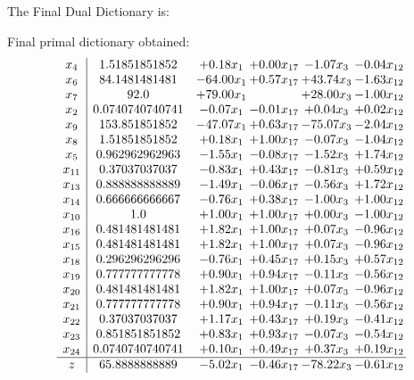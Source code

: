 \documentclass[8pt]{article}
\begin{document}
The Final Dual Dictionary is: 

 Final primal dictionary obtained: 
\[\begin{array}{c| c c@{\hskip 2pt} c@{\hskip 2pt} c@{\hskip 2pt} c@{\hskip 2pt} }
 x_{4}   &  1.51851851852 & +  0.18 x_{1} & +  0.00 x_{17} & -1.07 x_{3} & -0.04 x_{12}\\
 x_{6}   &  84.1481481481 & -64.00 x_{1} & +  0.57 x_{17} & + 43.74 x_{3} & -1.63 x_{12}\\
 x_{7}   &  92.0 & + 79.00 x_{1} &   & + 28.00 x_{3} & -1.00 x_{12}\\
 x_{2}   &  0.0740740740741 & -0.07 x_{1} & -0.01 x_{17} & +  0.04 x_{3} & +  0.02 x_{12}\\
 x_{9}   &  153.851851852 & -47.07 x_{1} & +  0.63 x_{17} & -75.07 x_{3} & -2.04 x_{12}\\
 x_{8}   &  1.51851851852 & +  0.18 x_{1} & +  1.00 x_{17} & -0.07 x_{3} & -1.04 x_{12}\\
 x_{5}   &  0.962962962963 & -1.55 x_{1} & -0.08 x_{17} & -1.52 x_{3} & +  1.74 x_{12}\\
 x_{11}   &  0.37037037037 & -0.83 x_{1} & +  0.43 x_{17} & -0.81 x_{3} & +  0.59 x_{12}\\
 x_{13}   &  0.888888888889 & -1.49 x_{1} & -0.06 x_{17} & -0.56 x_{3} & +  1.72 x_{12}\\
 x_{14}   &  0.666666666667 & -0.76 x_{1} & +  0.38 x_{17} & -1.00 x_{3} & +  1.00 x_{12}\\
 x_{10}   &  1.0 & +  1.00 x_{1} & +  1.00 x_{17} & +  0.00 x_{3} & -1.00 x_{12}\\
 x_{16}   &  0.481481481481 & +  1.82 x_{1} & +  1.00 x_{17} & +  0.07 x_{3} & -0.96 x_{12}\\
 x_{15}   &  0.481481481481 & +  1.82 x_{1} & +  1.00 x_{17} & +  0.07 x_{3} & -0.96 x_{12}\\
 x_{18}   &  0.296296296296 & -0.76 x_{1} & +  0.45 x_{17} & +  0.15 x_{3} & +  0.57 x_{12}\\
 x_{19}   &  0.777777777778 & +  0.90 x_{1} & +  0.94 x_{17} & -0.11 x_{3} & -0.56 x_{12}\\
 x_{20}   &  0.481481481481 & +  1.82 x_{1} & +  1.00 x_{17} & +  0.07 x_{3} & -0.96 x_{12}\\
 x_{21}   &  0.777777777778 & +  0.90 x_{1} & +  0.94 x_{17} & -0.11 x_{3} & -0.56 x_{12}\\
 x_{22}   &  0.37037037037 & +  1.17 x_{1} & +  0.43 x_{17} & +  0.19 x_{3} & -0.41 x_{12}\\
 x_{23}   &  0.851851851852 & +  0.83 x_{1} & +  0.93 x_{17} & -0.07 x_{3} & -0.54 x_{12}\\
 x_{24}   &  0.0740740740741 & +  0.10 x_{1} & +  0.49 x_{17} & +  0.37 x_{3} & +  0.19 x_{12}\\
\hline
z    &  65.8888888889 & -5.02 x_{1} & -0.46 x_{17} & -78.22 x_{3} & -0.61 x_{12}\\
\end{array}\]
\end{document}
